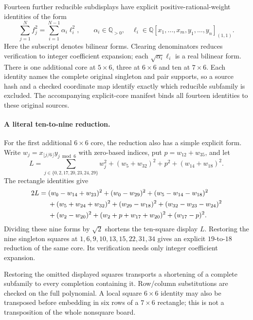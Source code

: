 \documentclass[11pt,a4paper]{article}
\theoremstyle{definition}
\newcommand{\Q}{\mathbb Q}
\begin{document}
Fourteen further reducible subdisplays have explicit positive-rational-weight
identities of the form
\begin{equation}\label{eq:weightedidentity}
 \sum_{j=1}^{N}f_j^2=\sum_{i=1}^{N-1}\alpha_i\ell_i^2,
 \qquad \alpha_i\in\Q_{>0},\quad
 \ell_i\in\Q[x_1,\ldots,x_m,y_1,\ldots,y_n]_{(1,1)}.
\end{equation}
Here the subscript denotes bilinear forms. Clearing denominators reduces
verification to integer coefficient expansion; each
$\sqrt{\alpha_i}\ell_i$ is a real bilinear form. There is one additional
core at $5\times6$, three at $6\times6$ and ten at $7\times6$.
Each identity names the complete original singleton and pair supports,
so a source hash and a checked coordinate map identify exactly which
reducible subfamily is excluded. The accompanying explicit-core manifest
binds all fourteen identities to these original sources.

\begin{samepage}
\paragraph{A literal ten-to-nine reduction.}
For the first additional $6\times6$ core, the reduction also has a simple
explicit form. Write $w_j=x_{\lfloor j/6\rfloor}y_{j\bmod6}$ with
zero-based indices, put $p=w_{12}+w_{35}$, and let
\[
 L=\sum_{j\in\{0,2,17,20,23,24,29\}}w_j^2
   +(w_5+w_{32})^2+p^2+(w_{14}+w_{18})^2.
\]
The rectangle identities give
\begin{align}\label{eq:explicitcore}
 2L={}&(w_0-w_{14}+w_{23})^2+(w_0-w_{29})^2
       +(w_5-w_{14}-w_{18})^2\notag\\
 &+(w_5+w_{24}+w_{32})^2+(w_{29}-w_{18})^2
       +(w_{32}-w_{23}-w_{24})^2\notag\\
 &+(w_2-w_{20})^2+(w_2+p+w_{17}+w_{20})^2+(w_{17}-p)^2.
\end{align}
Dividing these nine forms by $\sqrt2$ shortens the ten-square display
$L$. Restoring the nine singleton squares at
$1,6,9,10,13,15,22,31,34$ gives an explicit $19$-to-$18$ reduction
of the same core. Its verification needs only integer coefficient
expansion. 
\end{samepage}

Restoring the omitted displayed squares transports a shortening of a
complete subfamily to every completion containing it. Row/column
substitutions are checked on the full polynomial. A local square
$6\times6$ identity may also be transposed before embedding in six
rows of a $7\times6$ rectangle; this is not a transposition of the
whole nonsquare board.
\end{document}

